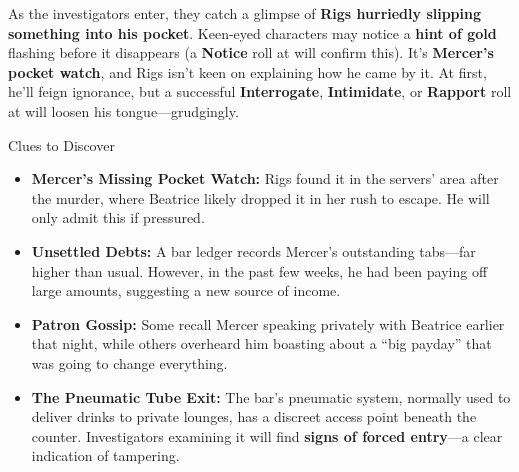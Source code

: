 As the investigators enter, they catch a glimpse of \textbf{Rigs hurriedly slipping something into his pocket}. Keen-eyed characters may notice a \textbf{hint of gold} flashing before it disappears (a \textbf{Notice} roll at \Difficult will confirm this). It’s \textbf{Mercer’s pocket watch}, and Rigs isn’t keen on explaining how he came by it. At first, he’ll feign ignorance, but a successful \textbf{Interrogate}, \textbf{Intimidate}, or \textbf{Rapport} roll at \Formidable will loosen his tongue—grudgingly.

\begin{WyrdComment}{Clues to Discover}  
	\begin{itemize}  
		\item \textbf{Mercer’s Missing Pocket Watch:} Rigs found it in the servers’ area after the murder, where Beatrice likely dropped it in her rush to escape. He will only admit this if pressured.  
		\item \textbf{Unsettled Debts:} A bar ledger records Mercer’s outstanding tabs—far higher than usual. However, in the past few weeks, he had been paying off large amounts, suggesting a new source of income.  
		\item \textbf{Patron Gossip:} Some recall Mercer speaking privately with Beatrice earlier that night, while others overheard him boasting about a “big payday” that was going to change everything.  
		\item \textbf{The Pneumatic Tube Exit:} The bar’s pneumatic system, normally used to deliver drinks to private lounges, has a discreet access point beneath the counter. Investigators examining it will find \textbf{signs of forced entry}—a clear indication of tampering.  
	\end{itemize}  
\end{WyrdComment}  

